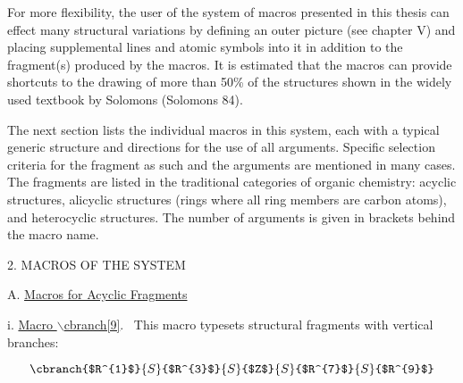 For more flexibility, the user of the system of macros 
 presented in this thesis can effect many structural
 variations by defining an outer picture (see chapter V)
 and placing supplemental lines and atomic symbols into
 it in addition to the fragment(s) produced by the macros.
 It is estimated that the \newpage
 \noindent macros can provide shortcuts
 to the drawing of more than 50\% of the structures shown
 in the widely used textbook by Solomons (Solomons 84).

 The next section lists the individual macros in this system,
 each with a typical generic structure and directions for
 the use of all arguments.  Specific selection criteria for
 the fragment as such and the arguments are mentioned in
 many cases.  The fragments are listed in the traditional
 categories of organic chemistry: acyclic structures,   
 alicyclic structures (rings where all ring members are
 carbon atoms), and heterocyclic structures.  The number
 of arguments is given in brackets behind the macro name.
 
 \vspace{\len mm}
 \centerline{2. MACROS OF THE SYSTEM}
 \vspace{\len mm}
 \noindent A. \underline{Macros for Acyclic Fragments}

 \vspace{\len mm}
 \indent i. \underline{Macro $\backslash $cbranch[9]}. \ This macro   
 typesets structural fragments with vertical branches:

 \[ \cbranch{$R^{1}$}{S}{$R^{3}$}{S}{$Z$}{S}{$R^{7}$}{S}{$R^{9}$} \]

